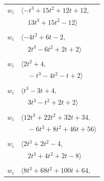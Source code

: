 \documentclass[11pt]{article}
\begin{document}
\begin{longtable}{@{}ll@{}}
$w_i$ & $\langle -t^{3}+15t^{2}+12t+12,$\\
 & $\quad 13t^{3}+15t^{2}-12\rangle$\\
\addlinespace[2pt]
\multicolumn{2}{@{}p{0.97\textwidth}@{}}{$i=20$, $D_i=1$, $\rho_{ij}$: $1{:}2, \allowbreak 2{:}1, \allowbreak 4{:}2, \allowbreak 5{:}1, \allowbreak 13{:}1, \allowbreak 31{:}1, \allowbreak 35{:}1$}\\
$w_i$ & $\langle -4t^{2}+6t-2,$\\
 & $\quad 2t^{3}-6t^{2}+2t+2\rangle$\\
\addlinespace[2pt]
\multicolumn{2}{@{}p{0.97\textwidth}@{}}{$i=21$, $D_i=1$, $\rho_{ij}$: $13{:}2, \allowbreak 16{:}2, \allowbreak 25{:}1, \allowbreak 30{:}2, \allowbreak 33{:}1, \allowbreak 35{:}1$}\\
$w_i$ & $\langle 2t^{2}+4,$\\
 & $\quad -t^{3}-4t^{2}-t+2\rangle$\\
\addlinespace[2pt]
\multicolumn{2}{@{}p{0.97\textwidth}@{}}{$i=22$, $D_i=1$, $\rho_{ij}$: $4{:}2, \allowbreak 10{:}2, \allowbreak 12{:}2, \allowbreak 14{:}1, \allowbreak 15{:}2, \allowbreak 19{:}2, \allowbreak 25{:}2$}\\
$w_i$ & $\langle t^{3}-3t+4,$\\
 & $\quad 3t^{3}-t^{2}+2t+2\rangle$\\
\addlinespace[2pt]
\multicolumn{2}{@{}p{0.97\textwidth}@{}}{$i=23$, $D_i=1$, $\rho_{ij}$: $2{:}2, \allowbreak 9{:}2, \allowbreak 11{:}2, \allowbreak 12{:}2, \allowbreak 15{:}2, \allowbreak 16{:}1, \allowbreak 28{:}2, \allowbreak 32{:}2, \allowbreak 35{:}1$}\\
$w_i$ & $\langle 12t^{3}+22t^{2}+32t+34,$\\
 & $\quad -6t^{3}+8t^{2}+46t+56\rangle$\\
\addlinespace[2pt]
\multicolumn{2}{@{}p{0.97\textwidth}@{}}{$i=24$, $D_i=1$, $\rho_{ij}$: $2{:}1, \allowbreak 5{:}2, \allowbreak 9{:}1, \allowbreak 15{:}2, \allowbreak 16{:}2, \allowbreak 18{:}1, \allowbreak 25{:}1$}\\
$w_i$ & $\langle 2t^{3}+2t^{2}-4,$\\
 & $\quad 2t^{3}+4t^{2}+2t-8\rangle$\\
\addlinespace[2pt]
\multicolumn{2}{@{}p{0.97\textwidth}@{}}{$i=25$, $D_i=1$, $\rho_{ij}$: $6{:}2, \allowbreak 7{:}2, \allowbreak 13{:}1, \allowbreak 18{:}2, \allowbreak 21{:}2, \allowbreak 22{:}1, \allowbreak 24{:}2, \allowbreak 32{:}1, \allowbreak 34{:}1, \allowbreak 36{:}2$}\\
$w_i$ & $\langle 8t^{3}+68t^{2}+100t+64,$\\

\end{longtable}
\end{document}
